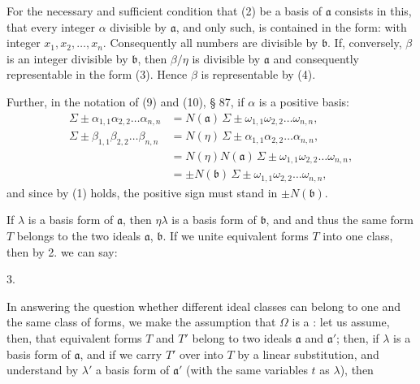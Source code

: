 For the necessary and sufficient condition that (2) be a basis of $\mathfrak{a}$ consists in this, that every integer $\alpha$ divisible by $\mathfrak{a}$, and only such, is contained in the form:
with integer $x_1, x_2, \ldots, x_n$. Consequently all numbers
are divisible by $\mathfrak{b}$. If, conversely, $\beta$ is an integer divisible by $\mathfrak{b}$, then $\beta/\eta$ is divisible by $\mathfrak{a}$ and consequently representable in the form (3). Hence $\beta$ is representable by (4).

Further, in the notation of (9) and (10), § 87, if $\alpha$ is a positive basis:
\[
\begin{aligned}
\Sigma \pm \alpha_{1,1}\alpha_{2,2}\ldots\alpha_{n,n} &= N(\mathfrak{a})\, \Sigma \pm \omega_{1,1}\omega_{2,2}\ldots\omega_{n,n}, \\
\Sigma \pm \beta_{1,1}\beta_{2,2}\ldots\beta_{n,n} &= N(\eta)\, \Sigma \pm \alpha_{1,1}\alpha_{2,2}\ldots\alpha_{n,n}, \\
&= N(\eta)N(\mathfrak{a})\, \Sigma \pm \omega_{1,1}\omega_{2,2}\ldots\omega_{n,n}, \\
&= \pm N(\mathfrak{b})\, \Sigma \pm \omega_{1,1}\omega_{2,2}\ldots\omega_{n,n},
\end{aligned}
\]
and since by (1)
holds, the positive sign must stand in $\pm N(\mathfrak{b})$.

If $\lambda$ is a basis form of $\mathfrak{a}$, then $\eta\lambda$ is a basis form of $\mathfrak{b}$, and
and thus the same form $T$ belongs to the two ideals $\mathfrak{a}$, $\mathfrak{b}$. If we unite equivalent forms $T$ into one class, then by 2. we can say:

3. 

In answering the question whether different ideal classes can belong to one and the same class of forms, we make the assumption that $\Omega$ is a : let us assume, then, that equivalent forms $T$ and $T'$ belong to two ideals $\mathfrak{a}$ and $\mathfrak{a}'$; then, if $\lambda$ is a basis form of $\mathfrak{a}$,
and if we carry $T'$ over into $T$ by a linear substitution, and understand by $\lambda'$ a basis form of $\mathfrak{a}'$ (with the same variables $t$ as $\lambda$), then
